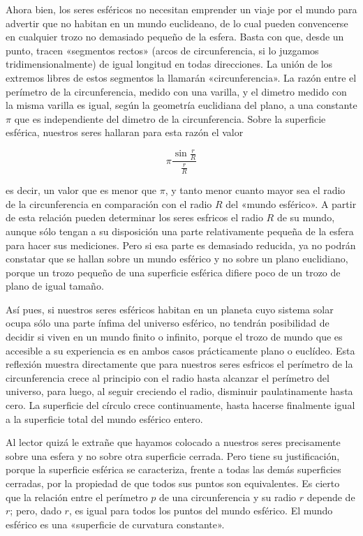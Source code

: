 \documentclass[spanish]{book}
\begin{document}
Ahora bien, los seres esféricos no necesitan emprender un viaje por el mundo para
advertir que no habitan en un mundo euclideano, de lo cual pueden convencerse en
cualquier trozo no demasiado pequeño de la esfera. Basta con que, desde un punto,
tracen «segmentos rectos» (arcos de circunferencia, si lo juzgamos
tridimensionalmente) de igual longitud en todas direcciones. La unión de los extremos
libres de estos segmentos la llamarán «circunferencia». La razón entre el perímetro de
la circunferencia, medido con una varilla, y el dimetro medido con la misma varilla
es igual, según la geometría euclidiana del plano, a una constante $\pi$ que es
independiente del dimetro de la circunferencia. Sobre la superficie esférica, nuestros
seres hallaran para esta razón el valor

\[\pi\frac{\sin\frac{r}{R}}{\frac{r}{R}}\]

es decir, un valor que es menor que $\pi$, y tanto menor cuanto mayor sea el radio de la
circunferencia en comparación con el radio $R$ del «mundo esférico». A partir de esta
relación pueden determinar los seres esfricos el radio $R$ de su mundo, aunque sólo
tengan a su disposición una parte relativamente pequeña de la esfera para hacer sus
mediciones. Pero si esa parte es demasiado reducida, ya no podrán constatar que se
hallan sobre un mundo esférico y no sobre un plano euclidiano, porque un trozo
pequeño de una superficie esférica difiere poco de un trozo de plano de igual tamaño.

Así pues, si nuestros seres esféricos habitan en un planeta cuyo sistema solar ocupa
sólo una parte ínfima del universo esférico, no tendrán posibilidad de decidir si viven
en un mundo finito o infinito, porque el trozo de mundo que es accesible a su
experiencia es en ambos casos prácticamente plano o euclídeo. Esta reflexión
muestra directamente que para nuestros seres esfricos el perímetro de la
circunferencia crece al principio con el radio hasta alcanzar el perímetro del
universo, para luego, al seguir creciendo el radio, disminuir paulatinamente hasta
cero. La superficie del círculo crece continuamente, hasta hacerse finalmente igual a
la superficie total del mundo esférico entero.

Al lector quizá le extrañe que hayamos colocado a nuestros seres precisamente sobre
una esfera y no sobre otra superficie cerrada. Pero tiene su justificación, porque la
superficie esférica se caracteriza, frente a todas las demás superficies cerradas, por la
propiedad de que todos sus puntos son equivalentes. Es cierto que la relación entre el
perímetro $p$ de una circunferencia y su radio $r$ depende de $r$; pero, dado $r$, es igual para
todos los puntos del mundo esférico. El mundo esférico es una «superficie de
curvatura constante».
\end{document}
